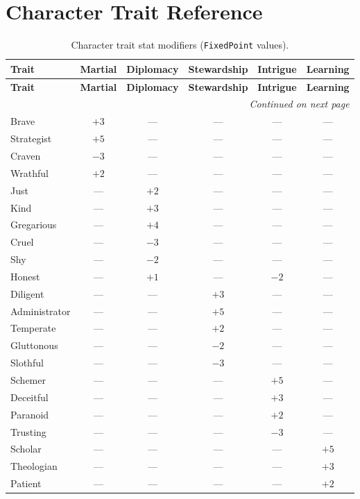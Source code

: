 \documentclass[a4paper, 11pt]{article}
\newcommand{\fp}{\texttt{FixedPoint}}
\begin{document}
\section{Character Trait Reference}
\label{app:traits}

\begin{longtable}{@{}lccccc@{}}
\caption{Character trait stat modifiers (\fp{} values).} \label{tab:traits} \\
\toprule
\textbf{Trait} & \textbf{Martial} & \textbf{Diplomacy} & \textbf{Stewardship} & \textbf{Intrigue} & \textbf{Learning} \\
\midrule
\endfirsthead
\toprule
\textbf{Trait} & \textbf{Martial} & \textbf{Diplomacy} & \textbf{Stewardship} & \textbf{Intrigue} & \textbf{Learning} \\
\midrule
\endhead
\midrule
\multicolumn{6}{r}{\textit{Continued on next page}} \\
\endfoot
\bottomrule
\endlastfoot
Brave         & $+3$ & ---   & ---   & ---   & ---   \\
Strategist    & $+5$ & ---   & ---   & ---   & ---   \\
Craven        & $-3$ & ---   & ---   & ---   & ---   \\
Wrathful      & $+2$ & ---   & ---   & ---   & ---   \\
Just          & ---  & $+2$  & ---   & ---   & ---   \\
Kind          & ---  & $+3$  & ---   & ---   & ---   \\
Gregarious    & ---  & $+4$  & ---   & ---   & ---   \\
Cruel         & ---  & $-3$  & ---   & ---   & ---   \\
Shy           & ---  & $-2$  & ---   & ---   & ---   \\
Honest        & ---  & $+1$  & ---   & $-2$  & ---   \\
Diligent      & ---  & ---   & $+3$  & ---   & ---   \\
Administrator & ---  & ---   & $+5$  & ---   & ---   \\
Temperate     & ---  & ---   & $+2$  & ---   & ---   \\
Gluttonous    & ---  & ---   & $-2$  & ---   & ---   \\
Slothful      & ---  & ---   & $-3$  & ---   & ---   \\
Schemer       & ---  & ---   & ---   & $+5$  & ---   \\
Deceitful     & ---  & ---   & ---   & $+3$  & ---   \\
Paranoid      & ---  & ---   & ---   & $+2$  & ---   \\
Trusting      & ---  & ---   & ---   & $-3$  & ---   \\
Scholar       & ---  & ---   & ---   & ---   & $+5$  \\
Theologian    & ---  & ---   & ---   & ---   & $+3$  \\
Patient       & ---  & ---   & ---   & ---   & $+2$  \\
\end{longtable}
\end{document}
